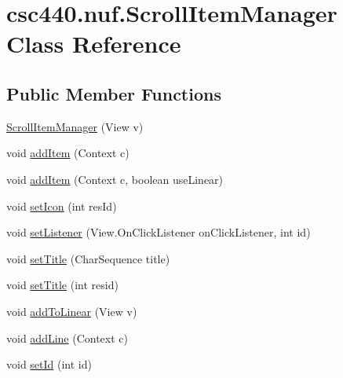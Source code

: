 \hypertarget{classcsc440_1_1nuf_1_1_scroll_item_manager}{\section{csc440.\-nuf.\-Scroll\-Item\-Manager Class Reference}
\label{classcsc440_1_1nuf_1_1_scroll_item_manager}
}
\subsection*{Public Member Functions}
\begin{DoxyCompactItemize}
\item 
\hyperlink{classcsc440_1_1nuf_1_1_scroll_item_manager_aa18c40f7a7adb588afc5cebd53b362f7}{Scroll\-Item\-Manager} (View v)
\item 
void \hyperlink{classcsc440_1_1nuf_1_1_scroll_item_manager_ab0e055a91a49439fa3a2ccca61a05657}{add\-Item} (Context c)
\item 
void \hyperlink{classcsc440_1_1nuf_1_1_scroll_item_manager_a649ec198b5730074bff55084fa12c578}{add\-Item} (Context c, boolean use\-Linear)
\item 
void \hyperlink{classcsc440_1_1nuf_1_1_scroll_item_manager_a1561fbe2466c1f47c901f3760ccbfa07}{set\-Icon} (int res\-Id)
\item 
void \hyperlink{classcsc440_1_1nuf_1_1_scroll_item_manager_a29b56004e0c6b27c4cf37abbe702b0e2}{set\-Listener} (View.\-On\-Click\-Listener on\-Click\-Listener, int id)
\item 
void \hyperlink{classcsc440_1_1nuf_1_1_scroll_item_manager_a593cfa1b9eb3288297683b1a370015e1}{set\-Title} (Char\-Sequence title)
\item 
void \hyperlink{classcsc440_1_1nuf_1_1_scroll_item_manager_a2d288f9456342f8b826196d6adba7222}{set\-Title} (int resid)
\item 
void \hyperlink{classcsc440_1_1nuf_1_1_scroll_item_manager_ab04c896f513d8e83a03d34f26e8ebd65}{add\-To\-Linear} (View v)
\item 
void \hyperlink{classcsc440_1_1nuf_1_1_scroll_item_manager_ad2ce97de474a3760d071b6dea3e2daf2}{add\-Line} (Context c)
\item 
void \hyperlink{classcsc440_1_1nuf_1_1_scroll_item_manager_ab3d59cd21b6ae1fb2ab0be5055ad49d7}{set\-Id} (int id)
\end{DoxyCompactItemize}


